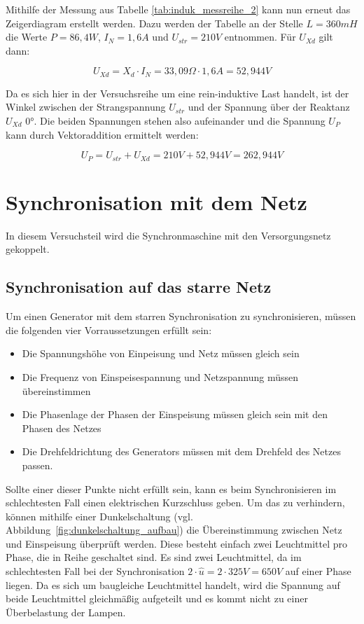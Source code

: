 \documentclass{report}
\begin{document}
Mithilfe der Messung aus Tabelle \ref{tab:induk_messreihe_2} kann nun erneut das Zeigerdiagram erstellt werden. Dazu werden der Tabelle an der Stelle $L=360mH$ die Werte $P=86,4W$, $I_{N} = 1,6A$ und $U_{str} = 210V$ entnommen. Für $U_{Xd}$ gilt dann:

\begin{equation}
	\label{eq:7}
	U_{Xd} = X_{d} \cdot I_{N} = 33,09\Omega \cdot 1,6A = 52,944V
\end{equation}

Da es sich hier in der Versuchsreihe um eine rein-induktive Last handelt, ist der Winkel zwischen der Strangspannung $U_{str}$ und der Spannung über der Reaktanz $U_{Xd}$ $0°$. Die beiden Spannungen stehen also aufeinander und die Spannung $U_{P}$ kann durch Vektoraddition ermittelt werden:

\begin{equation}
	\label{eq:8}
	U_{P} = U_{str} + U_{Xd} = 210V + 52,944V = 262,944V
\end{equation}


\section{Synchronisation mit dem Netz}
\label{sec:synchr-mit-dem}

In diesem Versuchsteil wird die Synchronmaschine mit den Versorgungsnetz gekoppelt.

\subsection{Synchronisation auf das starre Netz}
\label{sec:synchr-auf-das}

Um einen Generator mit dem starren Synchronisation zu synchronisieren, müssen die folgenden vier Vorraussetzungen erfüllt sein:

\begin{itemize}
	\item Die Spannungshöhe von Einpeisung und Netz müssen gleich sein
	\item Die Frequenz von Einspeisespannung und Netzspannung müssen übereinstimmen
	\item Die Phasenlage der Phasen der Einspeisung müssen gleich sein mit den Phasen des Netzes
	\item Die Drehfeldrichtung des Generators müssen mit dem Drehfeld des Netzes passen.
\end{itemize}

Sollte einer dieser Punkte nicht erfüllt sein, kann es beim Synchronisieren im schlechtesten Fall einen elektrischen Kurzschluss geben. Um das zu verhindern, können mithilfe einer Dunkelschaltung (vgl. Abbildung~\ref{fig:dunkelschaltung_aufbau}) die Übereinstimmung zwischen Netz und Einspeisung überprüft werden. Diese besteht einfach zwei Leuchtmittel pro Phase, die in Reihe geschaltet sind. Es sind zwei Leuchtmittel, da im schlechtesten Fall bei der Synchronisation $2\cdot \hat{u} = 2\cdot 325V = 650V$ auf einer Phase liegen. Da es sich um baugleiche Leuchtmittel handelt, wird die Spannung auf beide Leuchtmittel gleichmäßig aufgeteilt und es kommt nicht zu einer Überbelastung der Lampen.
\end{document}
